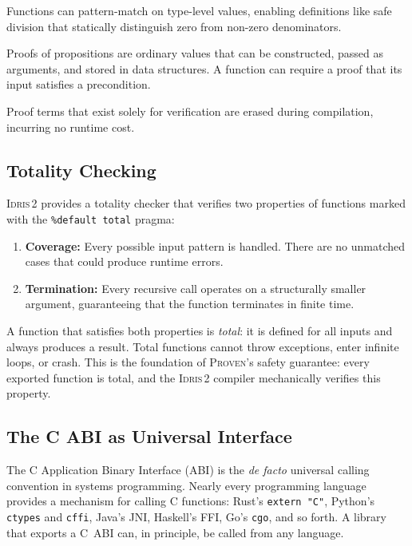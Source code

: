 \documentclass[11pt,a4paper]{article}
\newcommand{\proven}{\textsc{Proven}}
\newcommand{\idris}{\textsc{Idris\,2}}
\newcommand{\code}[1]{\texttt{#1}}
\begin{document}
\begin{description}[nosep]
  \item[Dependent pattern matching.] Functions can pattern-match on
    type-level values, enabling definitions like safe division that
    statically distinguish zero from non-zero denominators.
  \item[Proof terms as values.] Proofs of propositions are ordinary values
    that can be constructed, passed as arguments, and stored in data
    structures. A function can require a proof that its input satisfies a
    precondition.
  \item[Erasure.] Proof terms that exist solely for verification are erased
    during compilation, incurring no runtime cost.
\end{description}

\subsection{Totality Checking}
\label{sec:totality}

\idris{} provides a totality checker that verifies two properties of
functions marked with the \code{\%default total} pragma:

\begin{enumerate}[nosep]
  \item \textbf{Coverage:} Every possible input pattern is handled. There
    are no unmatched cases that could produce runtime errors.
  \item \textbf{Termination:} Every recursive call operates on a
    structurally smaller argument, guaranteeing that the function terminates
    in finite time.
\end{enumerate}

A function that satisfies both properties is \emph{total}: it is defined
for all inputs and always produces a result. Total functions cannot throw
exceptions, enter infinite loops, or crash. This is the foundation of
\proven{}'s safety guarantee: every exported function is total, and the
\idris{} compiler mechanically verifies this property.

\subsection{The C ABI as Universal Interface}
\label{sec:c-abi}

The C Application Binary Interface (ABI) is the \emph{de facto} universal
calling convention in systems programming. Nearly every programming language
provides a mechanism for calling C functions: Rust's \code{extern "C"},
Python's \code{ctypes} and \code{cffi}, Java's JNI, Haskell's FFI, Go's
\code{cgo}, and so forth. A library that exports a C~ABI can, in
principle, be called from any language.
\end{document}
